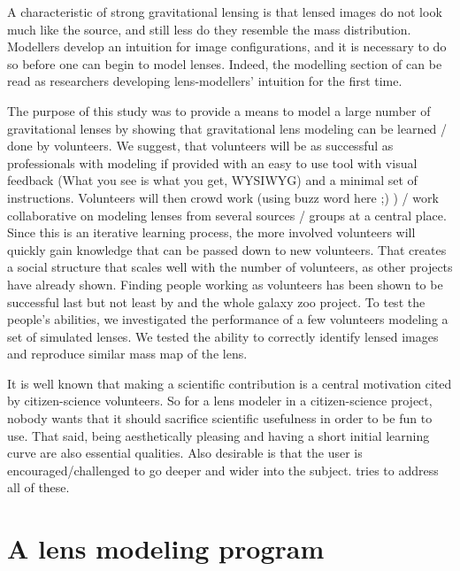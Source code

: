 A characteristic of strong gravitational lensing is that lensed images
do not look much like the source, and still less do they resemble the
mass distribution.  Modellers develop an intuition for image
configurations, and it is necessary to do so before one can begin to
model lenses.  Indeed, the modelling section of
\cite{1981ApJ...244..723Y} can be read as researchers developing
lens-modellers' intuition for the first time.

The purpose of this study was to provide a means to model a large number of gravitational lenses by showing that gravitational lens modeling can be learned / done by volunteers.
We suggest, that volunteers will be as successful as professionals with modeling if provided with an easy to use tool with visual feedback (What you see is what you get, WYSIWYG) and a minimal set of instructions.
Volunteers will then crowd work (using buzz word here ;) ) / work collaborative on modeling lenses from several sources / groups at a central place.
Since this is an iterative learning process, the more involved volunteers will quickly gain knowledge that can be passed down to new volunteers.
That creates a social structure that scales well with the number of volunteers, as other projects have already shown. %
Finding people working as volunteers has been shown to be successful last but not least by \sw and the whole galaxy zoo project.
To test the people's abilities, we investigated the performance of a few volunteers modeling a set of simulated lenses.
We tested the ability to correctly identify lensed images and reproduce similar mass map of the lens.

It is well known that making a scientific contribution is a central
motivation cited by citizen-science volunteers.  So for a lens
modeler in a citizen-science project, nobody wants that it should
sacrifice scientific usefulness in order to be fun to use.  That said,
being aesthetically pleasing and having a short initial learning curve
are also essential qualities.  Also desirable is that the user is
encouraged/challenged to go deeper and wider into the subject.
  \spl tries to address all of these.

\section{A lens modeling program}

